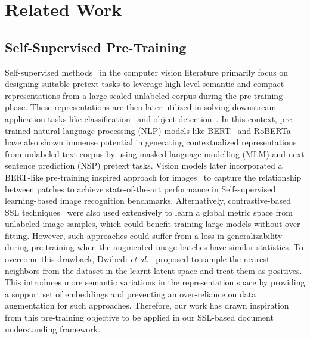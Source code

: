 \documentclass[preprint,review,12pt]{elsarticle}
\newcommand{\etal}{\textit{et al.}}
\begin{document}
%
 
\section{Related Work}
\label{sec:related}
\subsection{Self-Supervised Pre-Training}
Self-supervised methods~\cite{chen2020simple, misra2020self} in the computer vision literature primarily focus on designing suitable pretext tasks to leverage high-level semantic and compact representations from a large-scaled unlabeled corpus during the pre-training phase. These representations are then later utilized in solving downstream application tasks like classification~\cite{dosovitskiy2020image, touvron2021training} and object detection~\cite{carion2020end, zhu2020deformable}. In this context, pre-trained natural language processing (NLP) models like BERT~\cite{devlin2018bert} and RoBERTa~\cite{liu2019roberta} have also shown immense potential in generating contextualized representations from unlabeled text corpus by using masked language modelling (MLM) and next sentence prediction (NSP) pretext tasks. Vision models later incorporated a BERT-like pre-training inspired approach for images~\cite{bao2021beit, he2022masked} to capture the relationship between patches to achieve state-of-the-art performance in Self-supervised learning-based image recognition benchmarks. Alternatively, contrastive-based SSL techniques~\cite{chen2020simple, he2020momentum} were also used extensively to learn a global metric space from unlabeled image samples, which could benefit training large models without over-fitting. However, such approaches could suffer from a loss in generalizability during pre-training when the augmented image batches have similar statistics. To overcome this drawback, Dwibedi \etal~\cite{dwibedi2021little} proposed to sample the nearest neighbors from the dataset in the learnt latent space and treat them as positives. This introduces more semantic variations in the representation space by providing a support set of embeddings and preventing an over-reliance on data augmentation for such approaches. Therefore, our work has drawn inspiration from this pre-training objective to be applied in our SSL-based document understanding framework. 
\end{document}
